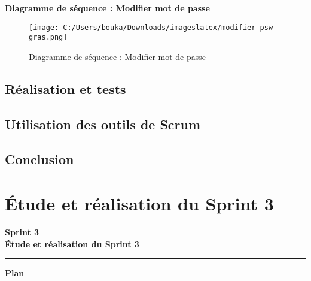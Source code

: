 \documentclass[a4paper,11pt]{report}
\begin{document}
\textbf{Diagramme de séquence : Modifier mot de passe}
\begin{figure}[htbp]
  \centering
  \texttt{[image: C:/Users/bouka/Downloads/imageslatex/modifier psw gras.png]}
  \caption{Diagramme de séquence : Modifier mot de passe}
  \label{fig:modifier_mot_de_passe}
\end{figure}



\section{Réalisation et tests}

\section{Utilisation des outils de Scrum}

\section{Conclusion}














\newpage

\chapter{Étude et réalisation du Sprint 3}
\thispagestyle{empty}

\vspace{2cm}
\begin{center}
  {\Huge\bfseries Sprint 3}\\[0.8em]
  {\LARGE\bfseries Étude et réalisation du Sprint 3}
\end{center}

\vspace{1.5cm}
\begin{center}
  \color{blue!60!black}\rule{0.6\textwidth}{1pt}
\end{center}
\vspace{1.5cm}

\begin{center}
  {\huge\bfseries Plan}\\[0.5em]
\end{center}
\vspace{1em}
\end{document}
